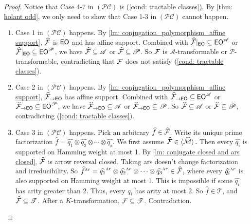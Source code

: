 \begin{proof}
    Notice that Case 4-7 in $(\mathcal{PC})$ is {\rm(\ref{cond: tractable classes})}.
    By \cref{thm: holant odd}, we only need to show that Case 1-3 in $(\mathcal{PC})$ cannot happen.
    \begin{enumerate}
        \item 
        Case 1 in $(\mathcal{PC})$ happens.
        By \cref{lm: conjugation_polymorphism_affine support}, $\widehat{\mathcal{F}}$ is $\textup{\textsf{EO}}$ and has affine support.
        Combined with $\widehat{\mathcal{F}}|_{\textup{\textsf{EO}}}\subseteq \textup{\textsf{EO}}^\mathscr{A}$ or $\widehat{\mathcal{F}}|_{\textup{\textsf{EO}}}\subseteq \textup{\textsf{EO}}^\mathscr{P}$, we have $\widehat{\mathcal{F}}\subseteq \mathscr{A}$ or $\widehat{\mathcal{F}}\subseteq \mathscr{P}$.
        So $\mathcal{F}$ is $\mathscr{A}$-transformable or $\mathscr{P}$-transformable, contradicting that $\mathcal{F}$ does not satisfy \rm{(\ref{cond: tractable classes})}.

        \item 
        Case 2 in $(\mathcal{PC})$ happens.
        By \cref{lm: conjugation_polymorphism_affine support}, $\widehat{\mathcal{F}}_{\to\textup{\textsf{EO}}}$ has affine support.
        Combined with $\widehat{\mathcal{F}}_{\to\textup{\textsf{EO}}}\subseteq \textup{\textsf{EO}}^\mathscr{A}$ or $\widehat{\mathcal{F}}_{\to\textup{\textsf{EO}}}\subseteq \textup{\textsf{EO}}^\mathscr{P}$, we have
        $\widehat{\mathcal{F}}_{\to\textup{\textsf{EO}}}\subseteq \mathscr{A}$ or  $\widehat{\mathcal{F}}_{\to\textup{\textsf{EO}}}\subseteq \mathscr{P}$.
        So $\widehat{\mathcal{F}}\subseteq \mathscr{A}$ or $\widehat{\mathcal{F}}\subseteq \mathscr{P}$,
        contradicting \rm{(\ref{cond: tractable classes})}.

        \item 
        Case 3 in $(\mathcal{PC})$ happens.
        Pick an arbitrary $\widehat{f}\in \widehat{\mathcal{F}}$.
        Write its unique prime factorization $\widehat{f}=\widehat{q_1}\otimes \widehat{q_2}\otimes\cdots\otimes \widehat{q_s}.$
        We first assume $\widehat{\mathcal{F}}\in \braket{\widehat{\mathcal{M}}}.$
        Then every $\widehat{q_i}$ is supported on Hamming weight at most 1.
        By \cref{lm: conjugate closed and ars closed}, $\widehat{\mathcal{F}}$ is arrow reversal closed.
        Taking {\sc ars} doesn't change factorization and irreducibility.
        So $\widehat{f}^{\textsc ar}=\widehat{q_1}^{\textsc ar}\otimes \widehat{q_2}^{\textsc ar}\otimes\cdots\otimes \widehat{q_3}^{\textsc ar}\in \widehat{\mathcal{F}}$, where every $\widehat{q_i}^{\textsc ar}$ is also supported on Hamming weight at most 1.
        This is impossible if some $\widehat{q_i}$ has arity greater than 2.
        Thus, every $q_i$ has arity at most 2.
        So $\widehat{f}\in {\mathscr{T}}$, and $\widehat{\mathcal{F}}\subseteq \mathscr{T}$.
        After a $K$-transformation,  $\mathcal{F}\subseteq \mathscr{T}$.
        Contradiction.
    \end{enumerate}
\end{proof}


